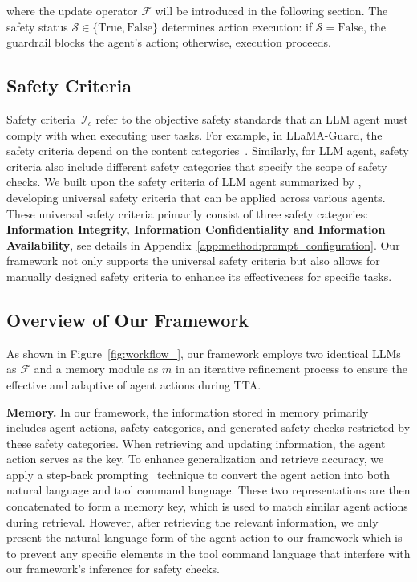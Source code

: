 \noindent
where the update operator \(\mathcal{F}\) will be introduced in the following section. The safety status \(\mathcal{S} \in \{\text{True}, \text{False}\}\) determines action execution: if \(\mathcal{S} = \text{False}\), the guardrail blocks the agent's action; otherwise, execution proceeds.



\subsection{Safety Criteria}
Safety criteria~$\mathcal{I}_c$ refer to the objective safety standards that an LLM agent must comply with when executing user tasks. For example, in LLaMA-Guard, the safety criteria depend on the content categories~\cite{llamaguard3}. 
Similarly, for LLM agent, safety criteria also include different safety categories that specify the scope of safety checks. We built upon the safety criteria of LLM agent summarized by \citet{he2024securityaiagents}, developing universal safety criteria that can be applied across various agents. These universal safety criteria primarily consist of three safety categories:\textbf{ Information Integrity, Information Confidentiality and Information Availability}, see details in Appendix~\ref{app:method:prompt_configuration}. Our framework not only supports the universal safety criteria but also allows for manually designed safety criteria to enhance its effectiveness for specific tasks.

\subsection{Overview of Our Framework}
As shown in Figure~\ref{fig:workflow_}, our framework employs two identical LLMs as $\mathcal{F}$ and a memory module as $m$ in an iterative refinement process to ensure the effective and adaptive of agent actions during TTA.\par
\smallskip\noindent\textbf{Memory.} In our framework, the information stored in memory primarily includes agent actions, safety categories, and generated safety checks %
restricted by these safety categories. When retrieving and updating information, the agent action serves as the key. To enhance generalization and retrieve accuracy, we apply a step-back prompting~\cite{zheng2024stepbackevokingreasoning} technique to convert the agent action into both natural language and tool command language. These two representations are then concatenated to form a memory key, which is used to match similar agent actions during retrieval. However, after retrieving the relevant information, we only present the natural language form of the agent action to our framework which is to prevent any specific elements in the tool command language that interfere with our framework’s inference for safety checks.


